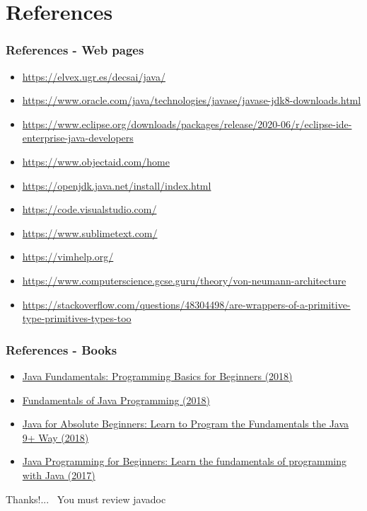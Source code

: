 \documentclass[11pt]{beamer}
\begin{document}
\section{References}
\begin{frame}
\frametitle{References - Web pages}
\begin{itemize}
\item \url{https://elvex.ugr.es/decsai/java/}
\item \url{https://www.oracle.com/java/technologies/javase/javase-jdk8-downloads.html}
\item \url{https://www.eclipse.org/downloads/packages/release/2020-06/r/eclipse-ide-enterprise-java-developers}
\item \url{https://www.objectaid.com/home}
\item \url{https://openjdk.java.net/install/index.html}
\item \url{https://code.visualstudio.com/}
\item \url{https://www.sublimetext.com/}
\item \url{https://vimhelp.org/}
\item \url{https://www.computerscience.gcse.guru/theory/von-neumann-architecture}
\item \url{https://stackoverflow.com/questions/48304498/are-wrappers-of-a-primitive-type-primitives-types-too}
\end{itemize}
\end{frame}

\begin{frame}
\frametitle{References - Books}
\begin{itemize}
\item \href{https://books.google.com.pe/books?id=vJ9QDwAAQBAJ}{Java Fundamentals: Programming Basics for Beginners (2018)}
\item \href{https://books.google.com.pe/books?id=mgFkDwAAQBAJ}{Fundamentals of Java Programming (2018)}
\item \href{https://books.google.com.pe/books?id=urd9DwAAQBAJ}{Java for Absolute Beginners: Learn to Program the Fundamentals the Java 9+ Way (2018)}
\item \href{https://books.google.com.pe/books?id=3RhKDwAAQBAJ}{Java Programming for Beginners: Learn the fundamentals of programming with Java (2017)}
\end{itemize}
\end{frame}

\begin{frame}
\begin{center}
Thanks!...
\
You must review javadoc
\end{center}
\end{frame}
\end{document}
